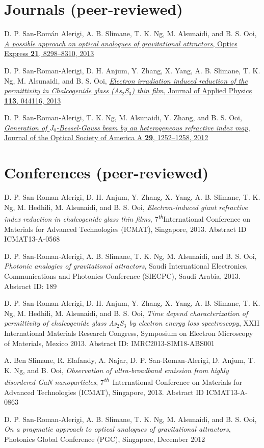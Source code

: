 \documentclass[margin,10pt]{res}
\renewcommand{\th}{\textsuperscript{\emph{th}}}
\newcommand{\subs}[1]{\normalfont #1}
\newcommand{\secs}[1]{\normalsize{\section{\subs{#1}}}}
\begin{document}
\secs{Journals (peer-reviewed)}
D. P. San-Román Alerigi, A. B. Slimane, T. K. Ng, M. Alsunaidi, and B. S. Ooi, \href{http://dx.doi.org/10.1364/OE.21.008298}{\emph{A possible approach on optical analogues of gravitational attractors}, Optics Express {\bf 21}, 8298--8310, 2013}

D. P. San-Roman-Alerigi, D. H. Anjum, Y. Zhang, X. Yang, A. B. Slimane, T. K. Ng, M. Alsunaidi, and B. S. Ooi, \href{http://link.aip.org/link/?JAP/113/044116}{\emph{Electron irradiation induced reduction of the permittivity in Chalcogenide glass (As$_2$S$_3$) thin film}, Journal of Applied Physics {\bf 113}, 044116, 2013}

D. P. San-Roman-Alerigi, T. K. Ng, M. Alsunaidi, Y. Zhang, and B. S. Ooi, \href{http://dx.doi.org/10.1364/JOSAA.29.001252}{\emph{Generation of $J_0$-Bessel-Gauss beam by an heterogeneous refractive index map}, Journal of the Optical Society of America A {\bf 29}, 1252--1258, 2012}


\secs{Conferences (peer-reviewed)}

D. P. San-Roman-Alerigi, D. H. Anjum, Y. Zhang, X. Yang, A. B. Slimane, T. K. Ng, M. Hedhili, M. Alsunaidi, and B. S. Ooi, \emph{Electron-induced giant refractive index reduction in chalcogenide glass thin films}, 7\th International Conference on Materials for Advanced Technologies (ICMAT), Singapore, 2013. Abstract ID ICMAT13-A-0568

D. P. San-Roman-Alerigi, A. B. Slimane, T. K. Ng, M. Alsunaidi, and B. S. Ooi, \emph{Photonic analogies of gravitational attractors}, Saudi International Electronics, Communications and Photonics Conference (SIECPC), Saudi Arabia, 2013. Abstract ID: 189

D. P. San-Roman-Alerigi, D. H. Anjum, Y. Zhang, X. Yang, A. B. Slimane, T. K. Ng, M. Hedhili, M. Alsunaidi, and B. S. Ooi, \emph{Time depend characterization of permittivity of chalcogenide glass As$_2$S$_3$ by electron energy loss spectroscopy}, XXII International Materials Research Congress, Symposium on Electron Microscopy of Materials, Mexico 2013. Abstract ID: IMRC2013-SIM18-ABS001

A. Ben Slimane, R. Elafandy, A. Najar, D. P. San-Roman-Alerigi, D. Anjum, T. K. Ng, and B. Ooi, \emph{Observation of ultra-broadband emission from highly disordered GaN nanoparticles}, 7\th~International Conference on Materials for Advanced Technologies (ICMAT), Singapore, 2013. Abstract ID ICMAT13-A-0863

D. P. San-Roman-Alerigi, A. B. Slimane, T. K. Ng, M. Alsunaidi, and B. S. Ooi, \emph{On a pragmatic approach to optical analogues of gravitational attractors}, Photonics Global Conference (PGC), Singapore, December 2012
\end{document}

